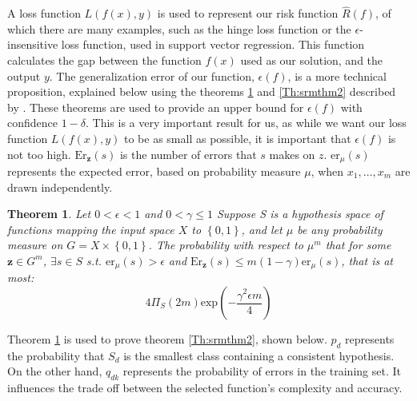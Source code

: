 A loss function $L(f(x),y)$ is used to represent our risk function $\hat{R}(f)$, of which there are many examples, such as the hinge loss function or the $\epsilon$-insensitive loss function, used in support vector regression. This function calculates the gap between the function $f(x)$ used as our solution, and the output $y$. \newline
The generalization error of our function, $\epsilon(f)$, is a more technical proposition, explained below using the theorems \ref{Th:srmthm1} and \ref{Th:srmthm2} described by \citet{shawetaylorsrm}. These theorems are used to provide an upper bound for $\epsilon(f)$ with confidence $1-\delta$. This is a very important result for us, as while we want our loss function $L(f(x),y)$ to be as small as possible, it is important that $\epsilon(f)$ is not too high. 
\newline
$\mathrm{Er}_{\mathbf{z}}(s)$ is the number of errors that $s$ makes on $z$. $\mathrm{er}_{\mu}(s)$ represents the expected error, based on probability measure $\mu$, when $x_1,\dots,x_m$ are drawn independently.

\newtheorem{srmtheorem}{Theorem}
\begin{srmtheorem} \label{Th:srmthm1}
Let $0<\epsilon<1$ and $0<\gamma\leq1$ Suppose S is a hypothesis space of functions mapping the input space $X$ to $\left\{0,1\right\}$, and let $\mu$ be any probability measure on $G=X\times\left\{0,1\right\}$. The probability with respect to $\mu^m$ that for some $\mathbf{z}\in G^m$, $\exists s \in S$ s.t. $\mathrm{er}_{\mu}(s)>\epsilon$ and $\mathrm{Er}_{\mathbf{z}}(s)\leq m(1-\gamma)\mathrm{er}_{\mu}(s)$, that is at most:
\begin{equation}\label{srmeqn1}
4\Pi_{S}(2m)\mathrm{exp}\left(-\frac{\gamma^2\epsilon m}{4}\right)
\end{equation}
\end{srmtheorem}

Theorem \ref{Th:srmthm1} is used to prove theorem \ref{Th:srmthm2}, shown below. $p_{d}$ represents the probability that $S_d$ is the smallest class containing a consistent hypothesis. On the other hand, $q_{dk}$ represents the probability of errors in the training set. It influences the trade off between the selected function's complexity and accuracy.

